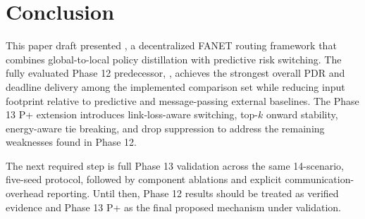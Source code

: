 \section{Conclusion}
\label{sec:conclusion}

This paper draft presented \method, a decentralized FANET routing framework that combines global-to-local policy distillation with predictive risk switching. The fully evaluated Phase 12 predecessor, \phaseTwelve, achieves the strongest overall PDR and deadline delivery among the implemented comparison set while reducing input footprint relative to predictive and message-passing external baselines. The Phase 13 P+ extension introduces link-loss-aware switching, top-$k$ onward stability, energy-aware tie breaking, and drop suppression to address the remaining weaknesses found in Phase 12.

The next required step is full Phase 13 validation across the same 14-scenario, five-seed protocol, followed by component ablations and explicit communication-overhead reporting. Until then, Phase 12 results should be treated as verified evidence and Phase 13 P+ as the final proposed mechanism under validation.
